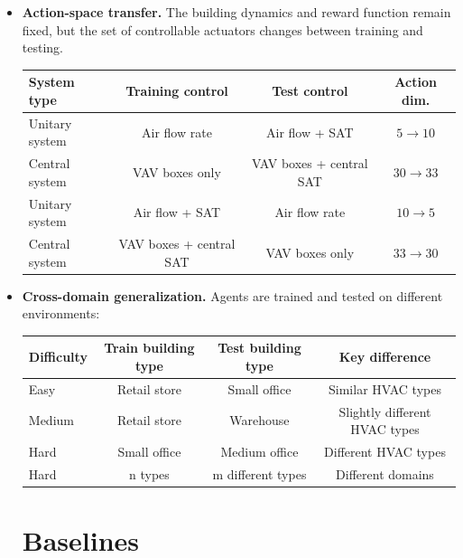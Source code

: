 \documentclass[10pt]{article} %
\begin{document}
\begin{itemize}
\item \textbf{Action-space transfer.}  The building dynamics and reward function remain fixed, but the set of controllable actuators changes between training and testing.

\begin{table}[h!]
\centering
\small
\begin{tabular}{lccc}
\toprule
\textbf{System type} & \textbf{Training control} & \textbf{Test control} & \textbf{Action dim.} \\
\midrule
Unitary system & Air flow rate & Air flow + SAT & $5 \rightarrow 10$ \\
Central system & VAV boxes only & VAV boxes + central SAT & $30 \rightarrow 33$  \\
Unitary system &  Air flow + SAT & Air flow rate & $10 \rightarrow 5$  \\
Central system & VAV boxes + central SAT & VAV boxes only & $33 \rightarrow 30$ \\
\bottomrule
\end{tabular}
\end{table}

\item \textbf{Cross-domain generalization.} Agents are trained and tested on different environments:

\begin{table}[h!]
\centering
\small
\begin{tabular}{lccc}
\toprule
\textbf{Difficulty} & \textbf{Train building type} & \textbf{Test building type} & \textbf{Key difference} \\
\midrule
Easy   & Retail store & Small office  & Similar HVAC types \\
Medium & Retail store & Warehouse     & Slightly different HVAC types \\
Hard   & Small office & Medium office & Different HVAC types \\
Hard   & n types      & m different types & Different domains \\
\bottomrule
\end{tabular}
\end{table}

\section{Baselines}
\label{sec:baselines}


\end{itemize}
\end{document}
